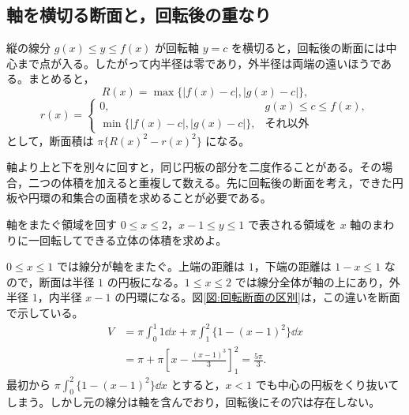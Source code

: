 \subsection{軸を横切る断面と，回転後の重なり}

縦の線分 $g(x)\leq y\leq f(x)$ が回転軸 $y=c$ を横切ると，回転後の断面には中心まで点が入る。したがって内半径は零であり，外半径は両端の遠いほうである。まとめると，
\[
R(x)=\max\{|f(x)-c|,|g(x)-c|\},
\]
\[
r(x)=
\begin{cases}
0,&g(x)\leq c\leq f(x),\\
\min\{|f(x)-c|,|g(x)-c|\},&\text{それ以外}
\end{cases}
\]
として，断面積は $\pi\{R(x)^2-r(x)^2\}$ になる。

軸より上と下を別々に回すと，同じ円板の部分を二度作ることがある。その場合，二つの体積を加えると重複して数える。先に回転後の断面を考え，できた円板や円環の和集合の面積を求めることが必要である。

\begin{example}{軸をまたぐ領域を回す}
$0\leq x\leq2$，$x-1\leq y\leq1$ で表される領域を $x$ 軸のまわりに一回転してできる立体の体積を求めよ。
\end{example}

$0\leq x\leq1$ では線分が軸をまたぐ。上端の距離は $1$，下端の距離は $1-x\leq1$ なので，断面は半径 $1$ の円板になる。$1\leq x\leq2$ では線分全体が軸の上にあり，外半径 $1$，内半径 $x-1$ の円環になる。図\ref{図:回転断面の区別}は，この違いを断面で示している。
\[
\begin{aligned}
V&=\pi\int_0^1 1\dd x
  +\pi\int_1^2\{1-(x-1)^2\}\dd x\\
 &=\pi+\pi\left[x-\frac{(x-1)^3}{3}\right]_1^2
 =\frac{5\pi}{3}.
\end{aligned}
\]
最初から $\pi\int_0^2\{1-(x-1)^2\}\dd x$ とすると，$x<1$ でも中心の円板をくり抜いてしまう。しかし元の線分は軸を含んでおり，回転後にその穴は存在しない。

